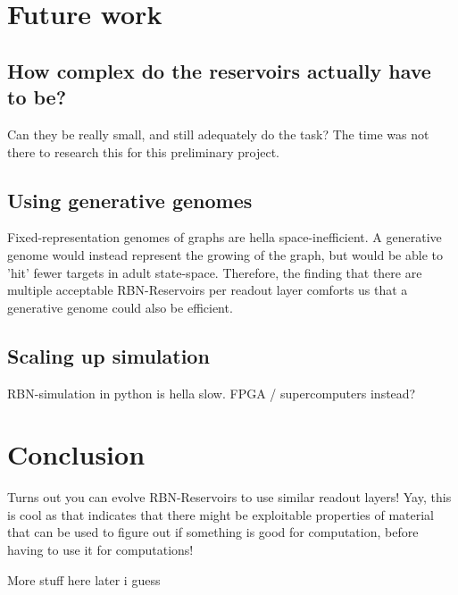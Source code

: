 \section{Future work}

\subsection{How complex do the reservoirs actually have to be?}

Can they be really small, and still adequately do the task?
The time was not there to research this for this preliminary project.

\subsection{Using generative genomes}

Fixed-representation genomes of graphs are hella space-inefficient.
A generative genome would instead represent the growing of the graph,
but would be able to 'hit' fewer targets in adult state-space.
Therefore, the finding that there are multiple acceptable RBN-Reservoirs per readout layer
comforts us that a generative genome could also be efficient.

\subsection{Scaling up simulation}

RBN-simulation in python is hella slow.
FPGA / supercomputers instead?

\section{Conclusion}

Turns out you can evolve RBN-Reservoirs to use similar readout layers!
Yay, this is cool as that indicates that there might be exploitable properties of material that can be used to figure out if something is good for computation, before having to use it for computations!

More stuff here later i guess
